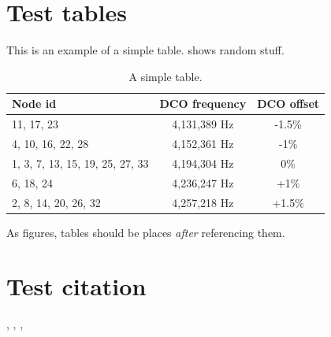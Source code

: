 \section{Test tables}

This is an example of a simple table.  shows random stuff.
%
\begin{table}[htb]
	\centering
	\caption{A simple table.}
	\begin{tabular}{l c c}
		\toprule
		Node id & DCO frequency & DCO offset\\ \midrule
		11, 17, 23 & 4,131,389 Hz & -1.5\% \\
		4, 10, 16, 22, 28 & 4,152,361 Hz & -1\% \\
		1, 3, 7, 13, 15, 19, 25, 27, 33 & 4,194,304 Hz & 0\% \\
		6, 18, 24 & 4,236,247 Hz & +1\% \\
		2, 8, 14, 20, 26, 32 & 4,257,218 Hz & +1.5\% \\
		\bottomrule
	\end{tabular}
	\label{tab:flocklab_clock_offset}
\end{table}

As figures, tables should be places \emph{after} referencing them.

\section{Test citation}

\cite{Goehringer2013}, \cite{Logvinenko2014}, \cite{Ogras2013}, \cite{Rantala2006}


\cite{Adetomi2018}
\cite{Adomat1996}
\cite{Andrews2005}
\cite{Arora2021}
\cite{Bansal2006}
\cite{Bloom}
\cite{Cashmore2015}
\cite{Chapin1996}
\cite{Chen2016}
\cite{Chervenak1999}
\cite{Conficconi2021}
\cite{Dally2001}
\cite{Djordjevic1996}
\cite{Fernandes2011}
\cite{Fernando2010}
\cite{Ferrandi2006}
\cite{Fowers2018}
\cite{FuYao2017}
\cite{Gandhi2005}
\cite{Golson1994}
\cite{greenwade93}
\cite{GuoKaiyuan2018}
\cite{GuoLicheng2022}
\cite{Hennessy2019}
\cite{Ibarra1977}
\cite{JiangYingtao2004}
\cite{JinShiyuan2008}
\cite{Kalms2019}
\cite{Koch2021}
\cite{Langhammer2021}
\cite{Leuenberger2021}
\cite{Mathwork}
\cite{Miyauchi2020}
\cite{Mohan2021}
\cite{Montanno2010}
\cite{Nikolic2021}
\cite{Nowatzki}
\cite{Oh1999}
\cite{Petersen2021}
\cite{Podlubne2018}
\cite{Podlubne2021}
\cite{Pravin18}
\cite{quigley2009ros}
\cite{Rainey}
\cite{Reggiani2021}
\cite{Ritschel2019}
\cite{Saez1999}
\cite{Scheduling_Handbook}
\cite{Schmit}
\cite{Stallings2008}
\cite{TangYi2015}
\cite{Thapliyal2010}
\cite{Trimberger}
\cite{Vasile2014}
\cite{Witte2018}
\cite{Wulf2020}
\cite{YangMing2018}
\cite{Zagan2019}
\cite{Zagan2020}
\cite{ZhaYue2021}
